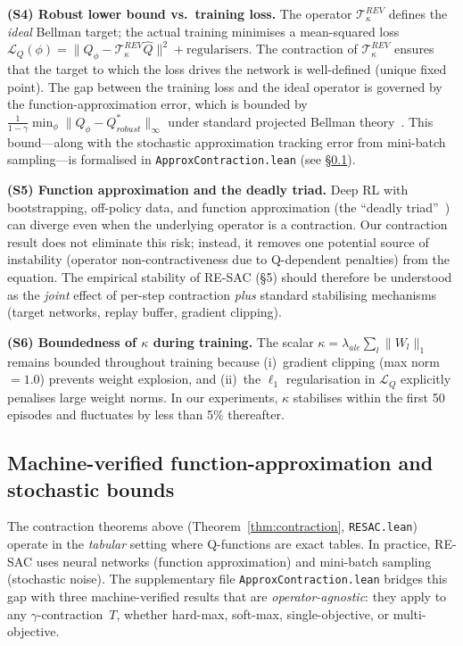 \medskip
\noindent\textbf{(S4) Robust lower bound vs.\ training loss.}
The operator $\mathcal{T}^{REV}_\kappa$ defines the \emph{ideal} Bellman target; the actual training minimises a mean-squared loss $\mathcal{L}_Q(\phi) = \|Q_\phi - \mathcal{T}^{REV}_\kappa \hat{Q}\|^2 + \text{regularisers}$.
The contraction of $\mathcal{T}^{REV}_\kappa$ ensures that the target to which the loss drives the network is well-defined (unique fixed point).  The gap between the training loss and the ideal operator is governed by the function-approximation error, which is bounded by $\frac{1}{1-\gamma}\min_\phi\|Q_\phi - Q^*_{robust}\|_\infty$ under standard projected Bellman theory~\cite{Bertsekas1996NeuroDynProg}.
This bound---along with the stochastic approximation tracking error from mini-batch sampling---is formalised in \texttt{ApproxContraction.lean} (see \S\ref{app:approx_bounds}).

\medskip
\noindent\textbf{(S5) Function approximation and the deadly triad.}
Deep RL with bootstrapping, off-policy data, and function approximation (the ``deadly triad''~\cite{VanHasselt2018DeadlyTriad}) can diverge even when the underlying operator is a contraction.
Our contraction result does not eliminate this risk; instead, it removes one potential source of instability (operator non-contractiveness due to Q-dependent penalties) from the equation.
The empirical stability of RE-SAC (\S{}5) should therefore be understood as the \emph{joint} effect of per-step contraction \emph{plus} standard stabilising mechanisms (target networks, replay buffer, gradient clipping).

\medskip
\noindent\textbf{(S6) Boundedness of $\kappa$ during training.}
The scalar $\kappa = \lambda_{ale}\sum_l\|W_l\|_1$ remains bounded throughout training because (i)~gradient clipping (max norm $= 1.0$) prevents weight explosion, and (ii)~the $\ell_1$ regularisation in $\mathcal{L}_Q$ explicitly penalises large weight norms.  In our experiments, $\kappa$ stabilises within the first 50 episodes and fluctuates by less than 5\% thereafter.

\subsection{Machine-verified function-approximation and stochastic bounds}
\label{app:approx_bounds}

The contraction theorems above (Theorem~\ref{thm:contraction}, \texttt{RESAC.lean}) operate in the \emph{tabular} setting where Q-functions are exact tables.  In practice, RE-SAC uses neural networks (function approximation) and mini-batch sampling (stochastic noise).  The supplementary file \texttt{ApproxContraction.lean} bridges this gap with three machine-verified results that are \emph{operator-agnostic}: they apply to any $\gamma$-contraction~$T$, whether hard-max, soft-max, single-objective, or multi-objective.

